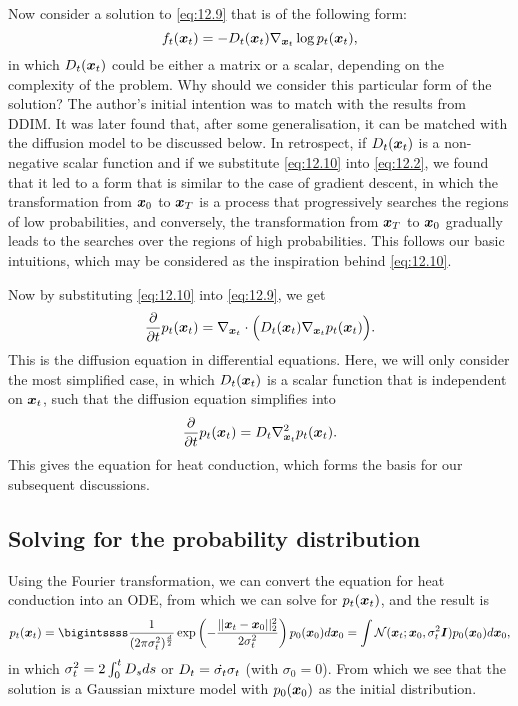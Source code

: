 Now consider a solution to \cref{eq:12.9} that is of the following form:
\begin{equation}
    \label{eq:12.10}
    f_t(\bm{x}_{t})=-D_t(\bm{x}_{t})\nabla_{\bm{x}_{t}}\log p_t (\bm{x}_{t}),
\end{equation}
in which $D_t(\bm{x}_{t})$ could be either a matrix or a scalar, depending on the complexity of the problem. Why should we consider this particular form of the solution? The author's initial intention was to match with the results from DDIM. It was later found that, after some generalisation, it can be matched with the diffusion model to be discussed below. In retrospect, if $D_t(\bm{x}_{t})$ is a non-negative scalar function and if we substitute \cref{eq:12.10} into \cref{eq:12.2}, we found that it led to a form that is similar to the case of gradient descent, in which the transformation from $\bm{x}_0$ to $\bm{x}_T$ is a process that progressively searches the regions of low probabilities, and conversely, the transformation from $\bm{x}_T$ to $\bm{x}_0$ gradually leads to the searches over the regions of high probabilities. This follows our basic intuitions, which may be considered as the inspiration behind \cref{eq:12.10}.

Now by substituting \cref{eq:12.10} into \cref{eq:12.9}, we get 
\begin{equation}
    \label{eq:12.11}
    \frac{\partial}{\partial t}p_t (\bm{x}_{t})=\nabla_{\bm{x}_{t}} \cdot \Bigl( D_t(\bm{x}_{t})\nabla_{\bm{x}_{t}} p_t(\bm{x}_{t}) \Bigr).
\end{equation}
This is the diffusion equation in differential equations. Here, we will only consider the most simplified case, in which $D_{t}(\bm{x}_{t})$ is a scalar function that is independent on $\bm{x}_{t}$, such that the diffusion equation simplifies into 
\begin{equation}
    \label{eq:12.12}
    \frac{\partial}{\partial t}p_t (\bm{x}_{t})=D_t  \nabla_{\bm{x}_{t}}^2 p_t(\bm{x}_{t}).
\end{equation}
This gives the equation for heat conduction, which forms the basis for our subsequent discussions.

\subsection{Solving for the probability distribution}

Using the Fourier transformation, we can convert the equation for heat conduction into an ODE, from which we can solve for $p_t(\bm{x}_{t})$, and the result is 
\begin{equation}
    \label{eq:12.13}
    p_t(\xt)=\bigintssss \frac{1}{(2\pi\sigma_t^2)^{\frac{d}{2}}}\exp\left(-\frac{||\xt-\x_0||^2_2}{2\sigmat^2}\right)p_0(\x_0)d\x_0=\int \mathcal{N}(\xt;\x_0,\sigma_t^2\bm{I})p_0(\x_0)d\x_0,
\end{equation}
in which $\sigma_t^2=2\int_0^t D_sds$ or $D_t=\dot{\sigma_t}\sigma_t$ (with $\sigma_0=0$). From which we see that the solution is a Gaussian mixture model with $p_0 (\bm{x}_0)$ as the initial distribution.

